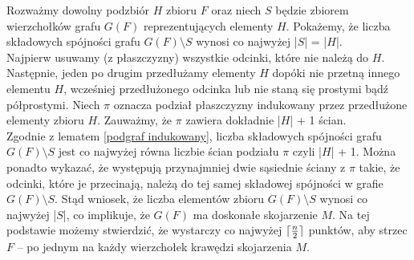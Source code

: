 \documentclass[brudnopis]{xmgr}
\DeclarePairedDelimiter\ceil{\lceil}{\rceil}
\theoremstyle{definition}
\begin{document}
\indent Rozważmy dowolny podzbiór $H$ zbioru $F$ oraz niech $S$ będzie zbiorem wierzchołków grafu $G(F)$ reprezentujących elementy $H$. Pokażemy, że liczba składowych spójności grafu $G(F) \setminus S$ wynosi co najwyżej |$S$| = |$H$|.
\\\indent Najpierw usuwamy (z płaszczyzny) wszystkie odcinki, które nie należą do $H$. Następnie, jeden po drugim przedłużamy elementy $H$ dopóki nie przetną innego elementu $H$, wcześniej przedłużonego odcinka lub nie staną się prostymi bądź półprostymi. Niech $\pi$ oznacza podział płaszczyzny indukowany przez przedłużone elementy zbioru $H$. Zauważmy, że $\pi$ zawiera dokładnie |$H$| + 1 ścian. 
\\\indent Zgodnie z lematem \ref{podgraf indukowany}, liczba składowych spójności grafu $G(F) \setminus S$ jest co najwyżej równa liczbie ścian podziału $\pi$ czyli |$H$| + 1. Można ponadto wykazać, że występują przynajmniej dwie sąsiednie ściany z $\pi$ takie, że odcinki, które je przecinają, należą do tej samej składowej spójności w grafie $G(F) \setminus S$. Stąd wniosek, że liczba elementów zbioru $G(F) \setminus S$ wynosi co najwyżej |$S$|, co implikuje, że $G(F)$ ma doskonałe skojarzenie $M$. Na tej podstawie możemy stwierdzić, że wystarczy co najwyżej $\ceil{\frac{n}{2}}$ punktów, aby strzec $F$ -- po jednym na każdy wierzchołek krawędzi skojarzenia $M$.
\end{document}
